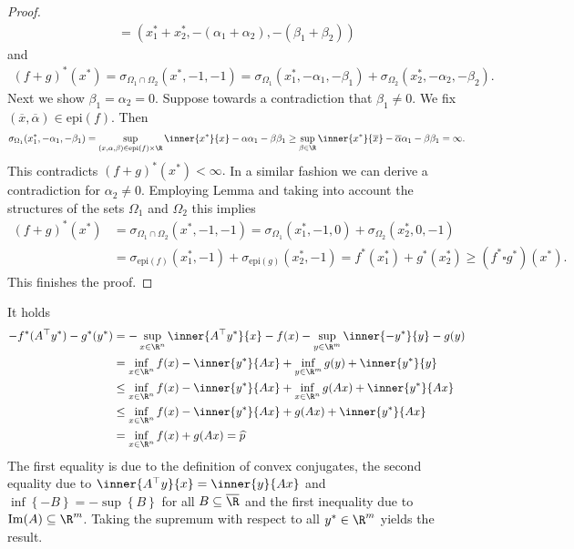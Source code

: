 \begin{proof}
\begin{gather}
    =
    (x^*_1+x^*_2,-(\alpha_1+\alpha_2),-(\beta_1+\beta_2))
  \end{gather}
  and
  \begin{gather}
    (f+g)^*(x^*)
    =
    \sigma_{\Omega_1\cap\Omega_2}
    (x^*,-1,-1)
    =
    \sigma_{\Omega_1}
    (x^*_1,-\alpha_1,-\beta_1)
    +
    \sigma_{\Omega_2}
    (x^*_2,-\alpha_2,-\beta_2).
  \end{gather}
  Next we show
  $\beta_1=\alpha_2=0.$
  Suppose towards a contradiction that 
  $\beta_1\neq 0.$ 
  We fix 
  $(\overline{x},\overline{\alpha})\in\mathrm{epi}(f).$
  Then
  \begin{gather}
    \sigma_{\Omega_1}
    (x^*_1,-\alpha_1,-\beta_1)
    =
    \sup_{(x,\alpha,\beta)\in \mathrm{epi}(f)\times \R}
    \inner{x^*}{x}-\alpha \alpha_1 -\beta \beta_1
    \ge
    \sup_{\beta\in \R}
    \inner{x^*}{\overline{x}}-\overline{\alpha} \alpha_1 -\beta \beta_1
    =\infty.
  \end{gather}
  This contradicts
  $
    (f+g)^*(x^*)<\infty.
  $
  In a similar fashion we can derive a contradiction for $\alpha_2\neq0.$
  Employing Lemma and taking into account the structures of the sets 
  $\Omega_1$ and $\Omega_2$ this implies
  \begin{align}
    (f+g)^*(x^*)
    &=
    \sigma_{\Omega_1\cap\Omega_2}
    (x^*,-1,-1)
    =
    \sigma_{\Omega_1}
    (x^*_1,-1,0)
    +
    \sigma_{\Omega_2}
    (x^*_2,0,-1)
    \\
    &=
    \sigma_{\mathrm{epi}(f)}(x^*_1,-1)
    +
    \sigma_{\mathrm{epi}(g)}(x^*_2,-1)
    =
    f^*(x^*_1)
    +
    g^*(x^*_2)
    \ge
    (f^*\square g^*)(x^*).
  \end{align}
  This finishes the proof.
\end{proof}
It holds
  \begin{align*}
    - f^*(A^\top y^*) - g^*(y^*) 
    &=
      -\sup_{x\in \R^n}\inner{A^\top y^*}{x}-f(x)
      -\sup_{y\in \R^m}\inner{-y^*}{y}-g(y)
      \\
    &=
    \inf_{x\in \R^n}f(x)-\inner{y^*}{Ax}
      +\inf_{y\in \R^m}g(y)+\inner{y^*}{y}
      \\
    &\le
      \inf_{x\in \R^n}f(x)-\inner{y^*}{Ax}
      +\inf_{x\in \R^n}g(Ax)+\inner{y^*}{Ax}
      \\
    &\le
      \inf_{x\in \R^n}f(x)-\inner{y^*}{Ax} + g(Ax) + \inner{y^*}{Ax}
      \\
    &=  
      \inf_{x\in \R^n}f(x)+g(Ax)
    =
      \widehat{p}
  \end{align*}
  The first equality is due to the definition of convex conjugates, the second equality due to $\inner{A^\top y}{x}=\inner{y}{Ax}$ and $\inf \left\{ -B \right\}=-\sup \left\{ B \right\}$ for all $B \subseteq \overline{\R}$ and the first inequality due to $\mathrm{Im}(A)\subseteq \R^m$.
  Taking the supremum with respect to all 
  $y^*\in\R^m$
  yields the result.

